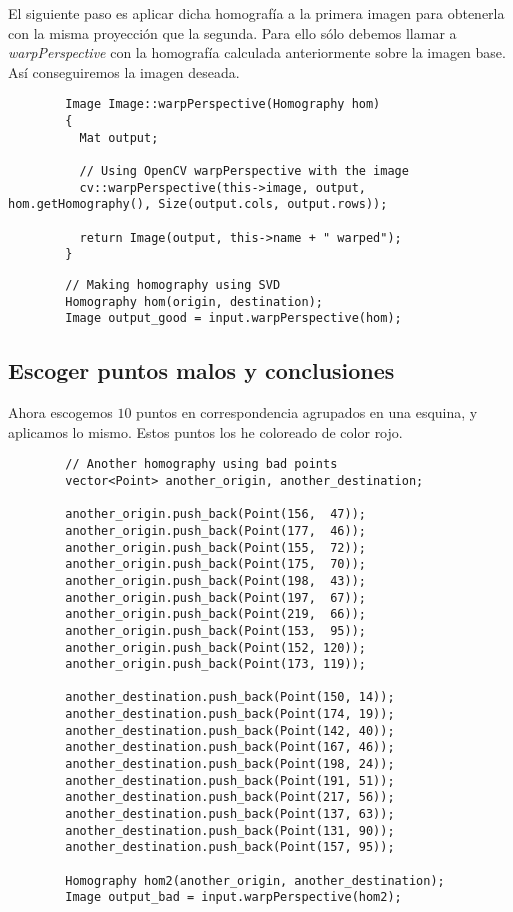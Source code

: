 \documentclass[a4paper, 11pt]{article}
\theoremstyle{definition}
\begin{document}
      El siguiente paso es aplicar dicha homografía a la primera imagen para obtenerla
      con la misma proyección que la segunda. Para ello sólo debemos llamar a \textit{warpPerspective}
      con la homografía calculada anteriormente sobre la imagen base. Así conseguiremos la imagen deseada.

      \begin{lstlisting}
        Image Image::warpPerspective(Homography hom)
        {
          Mat output;

          // Using OpenCV warpPerspective with the image
          cv::warpPerspective(this->image, output, hom.getHomography(), Size(output.cols, output.rows));

          return Image(output, this->name + " warped");
        }
      \end{lstlisting}

      \begin{lstlisting}
        // Making homography using SVD
        Homography hom(origin, destination);
      	Image output_good = input.warpPerspective(hom);
      \end{lstlisting}

    \subsection{Escoger puntos malos y conclusiones}

      Ahora escogemos $10$ puntos en correspondencia agrupados en una esquina, y aplicamos lo mismo.
      Estos puntos los he coloreado de color rojo.

      \begin{lstlisting}
        // Another homography using bad points
        vector<Point> another_origin, another_destination;

      	another_origin.push_back(Point(156,  47));
      	another_origin.push_back(Point(177,  46));
      	another_origin.push_back(Point(155,  72));
      	another_origin.push_back(Point(175,  70));
      	another_origin.push_back(Point(198,  43));
      	another_origin.push_back(Point(197,  67));
      	another_origin.push_back(Point(219,  66));
      	another_origin.push_back(Point(153,  95));
      	another_origin.push_back(Point(152, 120));
      	another_origin.push_back(Point(173, 119));

      	another_destination.push_back(Point(150, 14));
      	another_destination.push_back(Point(174, 19));
      	another_destination.push_back(Point(142, 40));
      	another_destination.push_back(Point(167, 46));
      	another_destination.push_back(Point(198, 24));
      	another_destination.push_back(Point(191, 51));
      	another_destination.push_back(Point(217, 56));
      	another_destination.push_back(Point(137, 63));
      	another_destination.push_back(Point(131, 90));
      	another_destination.push_back(Point(157, 95));

        Homography hom2(another_origin, another_destination);
      	Image output_bad = input.warpPerspective(hom2);
      \end{lstlisting}
\end{document}
